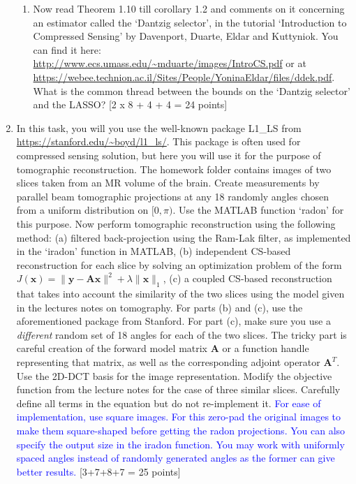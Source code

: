 \documentclass[11pt]{article}
\begin{document}
\begin{enumerate}
\begin{enumerate}
\item Now read Theorem 1.10 till corollary 1.2 and comments on it concerning an estimator called the `Dantzig selector', in the tutorial `Introduction to Compressed Sensing' by Davenport, Duarte, Eldar and Kuttyniok. You can find it here: \url{http://www.ecs.umass.edu/~mduarte/images/IntroCS.pdf} or at \url{https://webee.technion.ac.il/Sites/People/YoninaEldar/files/ddek.pdf}. What is the common thread between the bounds on the `Dantzig selector' and the LASSO? 
\textsf{[2 x 8 + 4 + 4 = 24 points]}
\end{enumerate}

\item In this task, you will you use the well-known package L1\_LS from \url{https://stanford.edu/~boyd/l1_ls/}. This package is often used for compressed sensing solution, but here you will use it for the purpose of tomographic reconstruction. The homework folder contains images of two slices taken from an MR volume of the brain. Create measurements by parallel beam tomographic projections at any 18 randomly angles chosen from a uniform distribution on $[0,\pi)$. Use the MATLAB function `radon' for this purpose. Now perform tomographic reconstruction using the following method: (a) filtered back-projection using the Ram-Lak filter, as implemented in the `iradon' function in MATLAB, (b) independent CS-based reconstruction for each slice by solving an optimization problem of the form $J(\boldsymbol{x}) = \|\boldsymbol{y}-\boldsymbol{Ax}\|^2 + \lambda \|\boldsymbol{x}\|_1$, (c) a coupled CS-based reconstruction that takes into account the similarity of the two slices using the model given in the lectures notes on tomography. For parts (b) and (c), use the aforementioned package from Stanford. For part (c), make sure you use a \emph{different} random set of 18 angles for each of the two slices. The tricky part is careful creation of the forward model matrix $\boldsymbol{A}$ or a function handle representing that matrix, as well as the corresponding adjoint operator $\boldsymbol{A}^T$. Use the 2D-DCT basis for the image representation. Modify the objective function from the lecture notes for the case of three similar slices. Carefully define all terms in the equation but do not re-implement it.
\textcolor{blue}{For ease of implementation, use square images. For this zero-pad the original images to make them square-shaped before getting the radon projections. You can also specify the output size in the iradon function. You may work with uniformly spaced angles instead of randomly generated angles as the former can give better results.}
 \textsf{[3+7+8+7 = 25 points]}


\end{enumerate}
\end{document}

